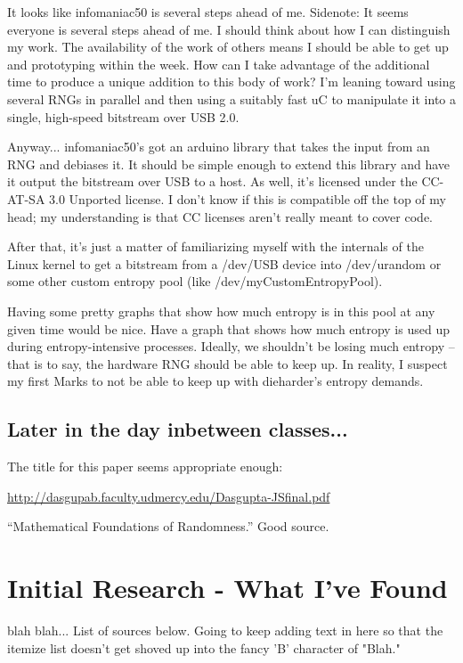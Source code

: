 \documentclass[journal]{IEEEtran}
\begin{document}
It looks like infomaniac50 is several steps ahead of me. Sidenote: It seems 
everyone is several steps ahead of me. I should think about how I can 
distinguish my work. The availability of the work of others means I should be 
able to get up and prototyping within the week. How can I take advantage of 
the additional time to produce a unique addition to this body of work? I'm 
leaning toward using several RNGs in parallel and then using a suitably fast 
uC to manipulate it into a single, high-speed bitstream over USB 2.0.

Anyway... infomaniac50's got an arduino library that takes the input from an
RNG and debiases it. It should be simple enough to extend this library and 
have it output the bitstream over USB to a host. As well, it's licensed 
under the CC-AT-SA 3.0 Unported license. I don't know if this is compatible 
off the top of my head; my understanding is that CC licenses aren't really 
meant to cover code.

After that, it's just a matter of familiarizing myself with the internals of 
the Linux kernel to get a bitstream from a /dev/USB device into /dev/urandom 
or some other custom entropy pool (like /dev/myCustomEntropyPool).

Having some pretty graphs that show how much entropy is in this pool at any 
given time would be nice. Have a graph that shows how much entropy is used 
up during entropy-intensive processes. Ideally, we shouldn't be losing much 
entropy --that is to say, the hardware RNG should be able to keep up. In 
reality, I suspect my first Marks to not be able to keep up with dieharder's 
entropy demands.

\subsection{Later in the day inbetween classes...}

The title for this paper seems appropriate enough:

\url{http://dasgupab.faculty.udmercy.edu/Dasgupta-JSfinal.pdf}

``Mathematical Foundations of Randomness.'' Good source.

\section{Initial Research - What I've Found}

 blah blah... List of sources below. Going to keep 
adding text in here so that the itemize list doesn't get shoved up into 
the fancy 'B' character of "Blah."
\end{document}
